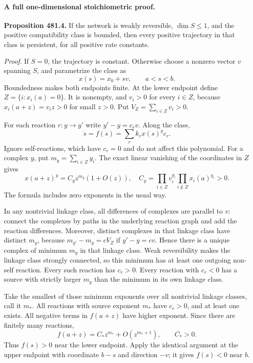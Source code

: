 \documentclass[11pt]{article}
\begin{document}
\paragraph{A full one-dimensional stoichiometric proof.}
\textbf{Proposition 481.4.} If the network is weakly reversible,
$\dim S\leq1$, and the positive compatibility class is bounded, then
every positive trajectory in that class is persistent, for all positive
rate constants.

\emph{Proof.}
If $S=0$, the trajectory is constant. Otherwise choose a nonzero vector
$v$ spanning $S$, and parametrize the class as
\[
 x(s)=x_0+s v,\qquad a<s<b.
\]
Boundedness makes both endpoints finite. At the lower endpoint define
$Z=\{i:x_i(a)=0\}$. It is nonempty, and $v_i>0$ for every $i\in Z$,
because $x_i(a+z)=v_i z>0$ for small $z>0$. Put
$V_Z=\sum_{i\in Z}v_i>0$.

For each reaction $r:y\to y'$ write $y'-y=c_r v$. Along the class,
\[
 \dot s=f(s)=\sum_r k_r x(s)^y c_r.
\]
Ignore self-reactions, which have $c_r=0$ and do not affect this
polynomial. For a complex $y$, put $m_y=\sum_{i\in Z}y_i$.
The exact linear vanishing of the coordinates in $Z$ gives
\begin{equation}\label{ra481:leading}
 x(a+z)^y=C_y z^{m_y}(1+O(z)),
 \quad
 C_y=\prod_{i\in Z}v_i^{y_i}
                   \prod_{i\notin Z}x_i(a)^{y_i}>0.
\end{equation}
The formula includes zero exponents in the usual way.

In any nontrivial linkage class, all differences of complexes are
parallel to $v$: connect the complexes by paths in the underlying
reaction graph and add the reaction differences. Moreover, distinct
complexes in that linkage class have distinct $m_y$, because
$m_{y'}-m_y=c V_Z$ if $y'-y=c v$. Hence there is a unique complex
of minimum $m_y$ in that linkage class. Weak reversibility makes the
linkage class strongly connected, so this minimum has at least one
outgoing non-self reaction. Every such reaction has $c_r>0$.
Every reaction with $c_r<0$ has a source with strictly larger $m_y$
than the minimum in its own linkage class.

Take the smallest of those minimum exponents over all nontrivial linkage
classes, call it $m_*$. All reactions with source exponent $m_*$ have
$c_r>0$, and at least one exists. All negative terms in $f(a+z)$ have
higher exponent. Since there are finitely many reactions,
\[
 f(a+z)=C_* z^{m_*}+O(z^{m_*+1}),\qquad C_*>0.
\]
Thus $f(s)>0$ near the lower endpoint. Apply the identical argument at
the upper endpoint with coordinate $b-s$ and direction $-v$; it gives
$f(s)<0$ near $b$.
\end{document}
